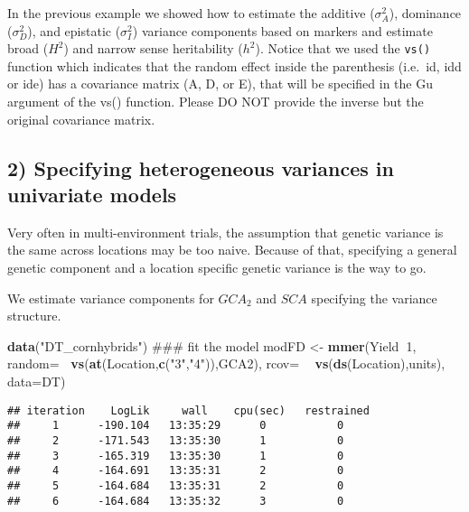 \documentclass[]{article}
\newenvironment{Shaded}{\begin{snugshade}}{\end{snugshade}}
\newcommand{\KeywordTok}[1]{\textcolor[rgb]{0.13,0.29,0.53}{\textbf{#1}}}
\newcommand{\DataTypeTok}[1]{\textcolor[rgb]{0.13,0.29,0.53}{#1}}
\newcommand{\DecValTok}[1]{\textcolor[rgb]{0.00,0.00,0.81}{#1}}
\newcommand{\StringTok}[1]{\textcolor[rgb]{0.31,0.60,0.02}{#1}}
\newcommand{\OperatorTok}[1]{\textcolor[rgb]{0.81,0.36,0.00}{\textbf{#1}}}
\newcommand{\NormalTok}[1]{#1}
\begin{document}
In the previous example we showed how to estimate the additive
(\(\sigma^2_A\)), dominance (\(\sigma^2_D\)), and epistatic
(\(\sigma^2_I\)) variance components based on markers and estimate broad
(\(H^2\)) and narrow sense heritability (\(h^2\)). Notice that we used
the \texttt{vs()} function which indicates that the random effect inside
the parenthesis (i.e.~id, idd or ide) has a covariance matrix (A, D, or
E), that will be specified in the Gu argument of the vs() function.
Please DO NOT provide the inverse but the original covariance matrix.

\subsection{2) Specifying heterogeneous variances in univariate
models}\label{specifying-heterogeneous-variances-in-univariate-models}

Very often in multi-environment trials, the assumption that genetic
variance is the same across locations may be too naive. Because of that,
specifying a general genetic component and a location specific genetic
variance is the way to go.

We estimate variance components for \(GCA_2\) and \(SCA\) specifying the
variance structure.

\begin{Shaded}
\begin{Highlighting}[]
\KeywordTok{data}\NormalTok{(}\StringTok{"DT_cornhybrids"}\NormalTok{)}
\NormalTok{### fit the model}
\NormalTok{modFD <-}\StringTok{ }\KeywordTok{mmer}\NormalTok{(Yield}\OperatorTok{~}\DecValTok{1}\NormalTok{, }
               \DataTypeTok{random=}\OperatorTok{~}\StringTok{ }\KeywordTok{vs}\NormalTok{(}\KeywordTok{at}\NormalTok{(Location,}\KeywordTok{c}\NormalTok{(}\StringTok{"3"}\NormalTok{,}\StringTok{"4"}\NormalTok{)),GCA2), }
               \DataTypeTok{rcov=} \OperatorTok{~}\StringTok{ }\KeywordTok{vs}\NormalTok{(}\KeywordTok{ds}\NormalTok{(Location),units),}
               \DataTypeTok{data=}\NormalTok{DT)}
\end{Highlighting}
\end{Shaded}

\begin{verbatim}
## iteration    LogLik     wall    cpu(sec)   restrained
##     1      -190.104   13:35:29      0           0
##     2      -171.543   13:35:30      1           0
##     3      -165.319   13:35:30      1           0
##     4      -164.691   13:35:31      2           0
##     5      -164.684   13:35:31      2           0
##     6      -164.684   13:35:32      3           0
\end{verbatim}
\end{document}

